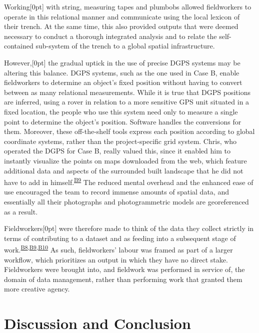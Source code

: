 \documentclass[
]{article}
\newcommand{\paragraphnumber}[1]{\marginnote{\color{lightgray}\tiny{#1}}[0pt]}
\begin{document}
Working\paragraphnumber{[74]} with string, measuring tapes and plumbobs
allowed fieldworkers to operate in this relational manner and
communicate using the local lexicon of their trench. At the same time,
this also provided outputs that were deemed necessary to conduct a
thorough integrated analysis and to relate the self-contained sub-system
of the trench to a global spatial infrastructure.

However,\paragraphnumber{[75]} the gradual uptick in the use of precise
DGPS systems may be altering this balance. DGPS systems, such as the one
used in Case B, enable fieldworkers to determine an object's fixed
position without having to convert between as many relational
measurements. While it is true that DGPS positions are inferred, using a
rover in relation to a more sensitive GPS unit situated in a fixed
location, the people who use this system need only to measure a single
point to determine the object's position. Software handles the
conversions for them. Moreover, these off-the-shelf tools express each
position according to global coordinate systems, rather than the
project-specific grid system. Chris, who operated the DGPS for Case B,
really valued this, since it enabled him to instantly visualize the
points on maps downloaded from the web, which feature additional data
and aspects of the surrounded built landscape that he did not have to
add in himself.\textsuperscript{\hyperref[sec-B9]{B9}} The reduced
mental overhead and the enhanced ease of use encouraged the team to
record immense amounts of spatial data, and essentially all their
photographs and photogrammetric models are georeferenced as a result.

Fieldworkers\paragraphnumber{[76]} were therefore made to think of the
data they collect strictly in terms of contributing to a dataset and as
feeding into a subsequent stage of
work.\textsuperscript{\hyperref[sec-B8]{B8},\hyperref[sec-B9]{B9},\hyperref[sec-B10]{B10}}
As such, fieldworkers' labour was framed as part of a larger workflow,
which prioritizes an output in which they have no direct stake.
Fieldworkers were brought into, and fieldwork was performed in service
of, the domain of data management, rather than performing work that
granted them more creative agency.

\section{Discussion and Conclusion}\label{discussion-and-conclusion}
\end{document}
